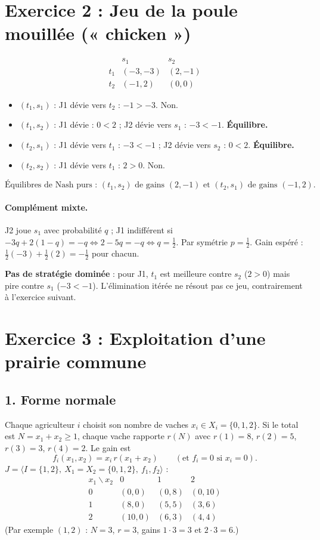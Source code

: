 \documentclass[11pt,a4paper]{article}
\begin{document}
\section*{Exercice 2 : Jeu de la poule mouillée (« chicken »)}
\[
\begin{array}{c|cc}
 & s_1 & s_2\\\hline
t_1 & (-3,-3) & (2,-1)\\
t_2 & (-1,2) & (0,0)
\end{array}
\]
\begin{itemize}
\item $(t_1,s_1)$ : J1 dévie vers $t_2$ : $-1>-3$. Non.
\item $(t_1,s_2)$ : J1 dévie : $0<2$ ; J2 dévie vers $s_1$ : $-3<-1$. \textbf{Équilibre.}
\item $(t_2,s_1)$ : J1 dévie vers $t_1$ : $-3<-1$ ; J2 dévie vers $s_2$ : $0<2$. \textbf{Équilibre.}
\item $(t_2,s_2)$ : J1 dévie vers $t_1$ : $2>0$. Non.
\end{itemize}
\[
\boxed{\text{Équilibres de Nash purs : } (t_1,s_2) \text{ de gains } (2,-1) \text{ et } (t_2,s_1) \text{ de gains } (-1,2).}
\]
\paragraph{Complément mixte.} J2 joue $s_1$ avec probabilité $q$ ; J1 indifférent si $-3q+2(1-q)=-q\iff 2-5q=-q\iff q=\frac12$. Par symétrie $p=\frac12$. Gain espéré : $\frac12(-3)+\frac12(2)=-\frac12$ pour chacun.

\textbf{Pas de stratégie dominée} : pour J1, $t_1$ est meilleure contre $s_2$ ($2>0$) mais pire contre $s_1$ ($-3<-1$). L'élimination itérée ne résout pas ce jeu, contrairement à l'exercice suivant.

\section*{Exercice 3 : Exploitation d'une prairie commune}

\subsection*{1. Forme normale}
Chaque agriculteur $i$ choisit son nombre de vaches $x_i\in X_i=\{0,1,2\}$. Si le total est $N=x_1+x_2\ge1$, chaque vache rapporte $r(N)$ avec $r(1)=8$, $r(2)=5$, $r(3)=3$, $r(4)=2$. Le gain est
\[
f_i(x_1,x_2)=x_i\,r(x_1+x_2)\qquad(\text{et } f_i=0 \text{ si } x_i=0).
\]
$J=\langle I=\{1,2\},\ X_1=X_2=\{0,1,2\},\ f_1,f_2\rangle$ :
\[
\begin{array}{c|ccc}
x_1\backslash x_2 & 0 & 1 & 2\\\hline
0 & (0,0) & (0,8) & (0,10)\\
1 & (8,0) & (5,5) & (3,6)\\
2 & (10,0) & (6,3) & (4,4)
\end{array}
\]
(Par exemple $(1,2)$ : $N=3$, $r=3$, gains $1\cdot3=3$ et $2\cdot3=6$.)
\end{document}
